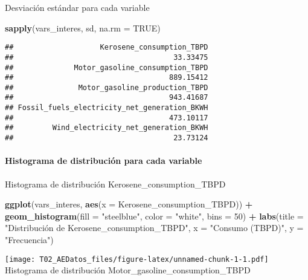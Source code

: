 \documentclass[
]{article}
\newenvironment{Shaded}{\begin{snugshade}}{\end{snugshade}}
\newcommand{\AttributeTok}[1]{\textcolor[rgb]{0.13,0.29,0.53}{#1}}
\newcommand{\ConstantTok}[1]{\textcolor[rgb]{0.56,0.35,0.01}{#1}}
\newcommand{\DecValTok}[1]{\textcolor[rgb]{0.00,0.00,0.81}{#1}}
\newcommand{\FunctionTok}[1]{\textcolor[rgb]{0.13,0.29,0.53}{\textbf{#1}}}
\newcommand{\NormalTok}[1]{#1}
\newcommand{\SpecialCharTok}[1]{\textcolor[rgb]{0.81,0.36,0.00}{\textbf{#1}}}
\newcommand{\StringTok}[1]{\textcolor[rgb]{0.31,0.60,0.02}{#1}}
\begin{document}
Desviación estándar para cada variable

\begin{Shaded}
\begin{Highlighting}[]
\FunctionTok{sapply}\NormalTok{(vars\_interes, sd, }\AttributeTok{na.rm =} \ConstantTok{TRUE}\NormalTok{)}
\end{Highlighting}
\end{Shaded}

\begin{verbatim}
##                    Kerosene_consumption_TBPD 
##                                     33.33475 
##              Motor_gasoline_consumption_TBPD 
##                                    889.15412 
##               Motor_gasoline_production_TBPD 
##                                    943.41687 
## Fossil_fuels_electricity_net_generation_BKWH 
##                                    473.10117 
##         Wind_electricity_net_generation_BKWH 
##                                     23.73124
\end{verbatim}

\paragraph{Histograma de distribución para cada
variable}\label{histograma-de-distribuciuxf3n-para-cada-variable}

Histograma de distribución Kerosene\_consumption\_TBPD

\begin{Shaded}
\begin{Highlighting}[]
\FunctionTok{ggplot}\NormalTok{(vars\_interes, }\FunctionTok{aes}\NormalTok{(}\AttributeTok{x =}\NormalTok{ Kerosene\_consumption\_TBPD)) }\SpecialCharTok{+}
  \FunctionTok{geom\_histogram}\NormalTok{(}\AttributeTok{fill =} \StringTok{"steelblue"}\NormalTok{, }\AttributeTok{color =} \StringTok{"white"}\NormalTok{, }\AttributeTok{bins =} \DecValTok{50}\NormalTok{) }\SpecialCharTok{+}
  \FunctionTok{labs}\NormalTok{(}\AttributeTok{title =} \StringTok{"Distribución de Kerosene\_consumption\_TBPD"}\NormalTok{,}
       \AttributeTok{x =} \StringTok{"Consumo (TBPD)"}\NormalTok{,}
       \AttributeTok{y =} \StringTok{"Frecuencia"}\NormalTok{)}
\end{Highlighting}
\end{Shaded}

\texttt{[image: T02\_AEDatos\_files/figure-latex/unnamed-chunk-1-1.pdf]}
Histograma de distribución Motor\_gasoline\_consumption\_TBPD
\end{document}
